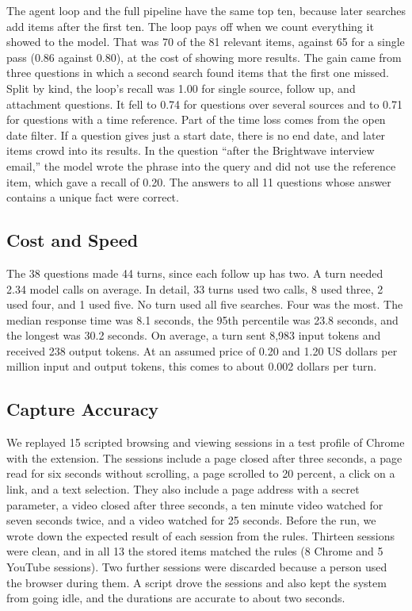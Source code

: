 \documentclass[conference]{IEEEtran}
\begin{document}
The agent loop and the full pipeline have the same top ten, because later searches add items after the first ten. The loop pays off when we count everything it showed to the model. That was 70 of the 81 relevant items, against 65 for a single pass (0.86 against 0.80), at the cost of showing more results. The gain came from three questions in which a second search found items that the first one missed. Split by kind, the loop's recall was 1.00 for single source, follow up, and attachment questions. It fell to 0.74 for questions over several sources and to 0.71 for questions with a time reference. Part of the time loss comes from the open date filter. If a question gives just a start date, there is no end date, and later items crowd into its results. In the question ``after the Brightwave interview email,'' the model wrote the phrase into the query and did not use the reference item, which gave a recall of 0.20. The answers to all 11 questions whose answer contains a unique fact were correct.

\subsection{Cost and Speed}
The 38 questions made 44 turns, since each follow up has two. A turn needed 2.34 model calls on average. In detail, 33 turns used two calls, 8 used three, 2 used four, and 1 used five. No turn used all five searches. Four was the most. The median response time was 8.1 seconds, the 95th percentile was 23.8 seconds, and the longest was 30.2 seconds. On average, a turn sent 8,983 input tokens and received 238 output tokens. At an assumed price of 0.20 and 1.20 US dollars per million input and output tokens, this comes to about 0.002 dollars per turn.

\subsection{Capture Accuracy}
We replayed 15 scripted browsing and viewing sessions in a test profile of Chrome with the extension. The sessions include a page closed after three seconds, a page read for six seconds without scrolling, a page scrolled to 20 percent, a click on a link, and a text selection. They also include a page address with a secret parameter, a video closed after three seconds, a ten minute video watched for seven seconds twice, and a video watched for 25 seconds. Before the run, we wrote down the expected result of each session from the rules. Thirteen sessions were clean, and in all 13 the stored items matched the rules (8 Chrome and 5 YouTube sessions). Two further sessions were discarded because a person used the browser during them. A script drove the sessions and also kept the system from going idle, and the durations are accurate to about two seconds.
\end{document}
